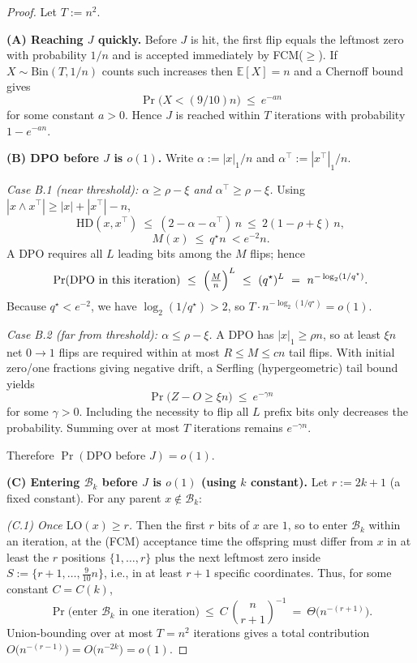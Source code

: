 \documentclass[lettersize,journal]{IEEEtran}
\begin{document}
\begin{proof}
	Let $T:=n^2$.
	
	\medskip\noindent
	\textbf{(A) Reaching $J$ quickly.}
	Before $J$ is hit, the first flip equals the leftmost zero with probability $1/n$ and is accepted
	immediately by FCM($\ge$).  If $X\sim\mathrm{Bin}(T,1/n)$ counts such increases then
	$\mathbb{E}[X]=n$ and a Chernoff bound gives
	\[
	\Pr\bigl(X<(9/10)n\bigr)\ \le\ e^{-a n}
	\]
	for some constant $a>0$. Hence $J$ is reached within $T$ iterations with probability $1-e^{-a n}$.
	
	\medskip\noindent
	\textbf{(B) DPO before $J$ is $o(1)$.}
	Write $\alpha:=|x|_1/n$ and $\alpha^\top:=|x^\top|_1/n$.
	
	\emph{Case B.1 (near threshold): $\alpha\ge \rho-\xi$ and $\alpha^\top\ge \rho-\xi$.}
	Using $|x\wedge x^\top|\ge |x|+|x^\top|-n$,
	\[
	\mathrm{HD}(x,x^\top)\ \le\ (2-\alpha-\alpha^\top)\,n\ \le\ 2(1-\rho+\xi)\,n,
	\]
	\[
	M(x)\ \le\ q^\star n\ <e^{-2}n
	.
	\]
	A DPO requires all $L$ leading bits among the $M$ flips; hence
	\[
	\Pr(\text{DPO in this iteration})
	\ \le\
	\Bigl(\tfrac{M}{n}\Bigr)^{L}
	\ \le\
	(q^\star)^{L}
	\ =\
	n^{-\log_{2}(1/q^\star)}.
	\]
	Because $q^\star<e^{-2}$, we have $\log_{2}(1/q^\star)>2$, so $T\cdot n^{-\log_{2}(1/q^\star)}=o(1)$.
	
	\emph{Case B.2 (far from threshold): $\alpha\le \rho-\xi$.}
	A DPO has $|x|_1\ge \rho n$, so at least $\xi n$ net $0\!\to\!1$ flips are required within at most
	$R\le M\le cn$ tail flips. With initial zero/one fractions giving negative drift,
	a Serfling (hypergeometric) tail bound yields
	\[
	\Pr\bigl(Z-O\ge \xi n\bigr)\ \le\ e^{-\gamma n}
	\]
	for some $\gamma>0$. Including the necessity to flip all $L$ prefix bits only decreases the probability.
	Summing over at most $T$ iterations remains $e^{-\gamma n}$.
	
	Therefore $\Pr(\text{DPO before }J)=o(1)$.
	
	\medskip\noindent
	\textbf{(C) Entering $\mathcal{B}_k$ before $J$ is $o(1)$ (using $k$ constant).}
	Let $r:=2k{+}1$ (a fixed constant).  For any parent $x\notin\mathcal{B}_k$:
	
	\emph{(C.1) Once $\mathrm{LO}(x)\ge r$.}
	Then the first $r$ bits of $x$ are $1$, so to enter $\mathcal{B}_k$ within an iteration, at the (FCM) acceptance time the offspring must differ from $x$ in at least the $r$ positions $\{1,\dots,r\}$ plus the next leftmost zero inside $S:=\{r{+}1,\dots,\tfrac{9}{10}n\}$, i.e., in at least $r{+}1$ specific coordinates. Thus, for some constant $C=C(k)$,
	\[
	\Pr\bigl(\text{enter } \mathcal{B}_k \text{ in one iteration}\bigr)
	\ \le\
	C\,\binom{n}{r+1}^{-1}
	\ =\
	\Theta\!\big(n^{-(r+1)}\big).
	\]
	Union-bounding over at most $T=n^2$ iterations gives a total contribution
	$O\!\big(n^{-(r-1)}\big)=O\!\big(n^{-2k}\big)=o(1)$.
	

\end{proof}
\end{document}
